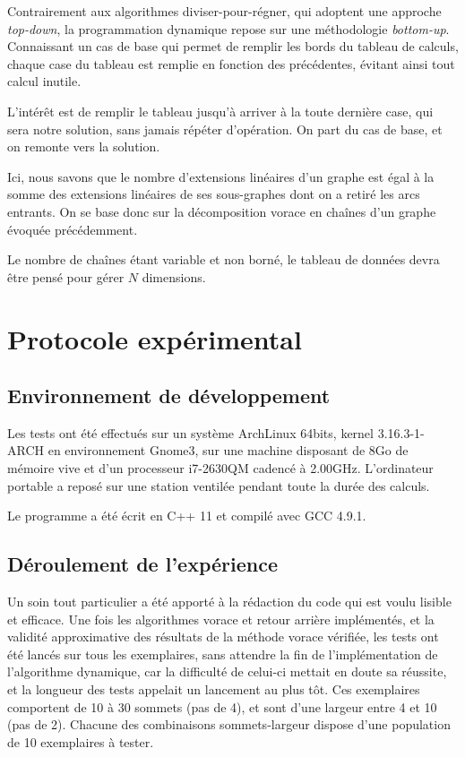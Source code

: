 \documentclass[10pt,a4paper]{article}
\begin{document}
Contrairement aux algorithmes diviser-pour-régner, qui adoptent une approche \textit{top-down}, la programmation dynamique repose sur une méthodologie \textit{bottom-up}. Connaissant un cas de base qui permet de remplir les \og bords \fg du tableau de calculs, chaque case du tableau est remplie en fonction des précédentes, évitant ainsi tout calcul inutile.

L'intérêt est de remplir le tableau jusqu'à arriver à la toute dernière case, qui sera notre solution, sans jamais répéter d'opération. On part du cas de base, et on remonte vers la solution.

Ici, nous savons que le nombre d'extensions linéaires d'un graphe est égal à la somme des extensions linéaires de ses sous-graphes dont on a retiré les arcs entrants. On se base donc sur la décomposition vorace en chaînes d'un graphe évoquée précédemment.

Le nombre de chaînes étant variable et non borné, le tableau de données devra être pensé pour gérer $ N $ dimensions.

\newpage

\section{Protocole expérimental}

\subsection{Environnement de développement}

Les tests ont été effectués sur un système ArchLinux 64bits, kernel 3.16.3-1-ARCH en environnement Gnome3, sur une machine disposant de 8Go de mémoire vive et d'un processeur i7-2630QM cadencé à 2.00GHz. L'ordinateur portable a reposé sur une station ventilée pendant toute la durée des calculs.

Le programme a été écrit en C++ 11 et compilé avec GCC 4.9.1.

\subsection{Déroulement de l'expérience}

Un soin tout particulier a été apporté à la rédaction du code qui est voulu lisible et efficace.
Une fois les algorithmes vorace et retour arrière implémentés, et la validité approximative des résultats de la méthode vorace vérifiée, les tests ont été lancés sur tous les exemplaires, sans attendre la fin de l'implémentation de l'algorithme dynamique, car la difficulté de celui-ci mettait en doute sa réussite, et la longueur des tests appelait un lancement au plus tôt. Ces exemplaires comportent de 10 à 30 sommets (pas de 4), et sont d'une largeur entre 4 et 10 (pas de 2). Chacune des combinaisons sommets-largeur dispose d'une population de 10 exemplaires à tester.
\end{document}
